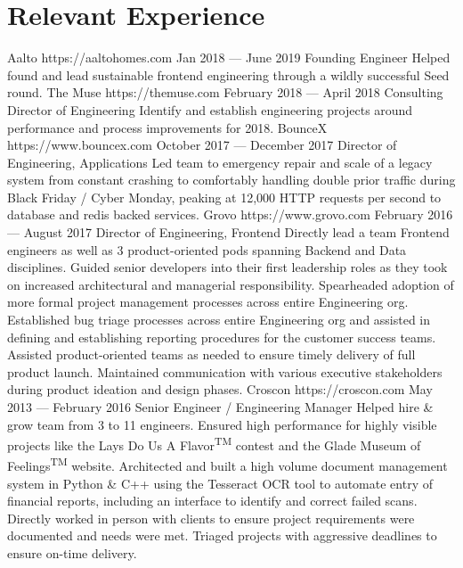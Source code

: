 \documentclass{resume}
\begin{document}
\smallskip

\section{Relevant Experience}

\employer
    {Aalto}
    {https://aaltohomes.com}
    {Jan 2018 --- June 2019}
    {Founding Engineer}
    {Helped found and lead sustainable frontend engineering through a wildly successful Seed round.}
\employer
    {The Muse}
    {https://themuse.com}
    {February 2018 --- April 2018}
    {Consulting Director of Engineering}
    {Identify and establish engineering projects around performance and process improvements for 2018.}
\employer
    {BounceX}
    {https://www.bouncex.com}
    {October 2017 --- December 2017}
    {Director of Engineering, Applications}
    {Led team to emergency repair and scale of a legacy system from constant crashing to comfortably handling double prior traffic during Black Friday / Cyber Monday, peaking at 12,000 HTTP requests per second to database and redis backed services.}
\employer
    {Grovo}
    {https://www.grovo.com}
    {February 2016 --- August 2017}
    {Director of Engineering, Frontend}
    {Directly lead a team Frontend engineers as well as 3 product-oriented pods spanning Backend and Data disciplines. Guided senior developers into their first leadership roles as they took on increased architectural and managerial responsibility. Spearheaded adoption of more formal project management processes across entire Engineering org. Established bug triage processes across entire Engineering org and assisted in defining and establishing reporting procedures for the customer success teams. Assisted product-oriented teams as needed to ensure timely delivery of full product launch. Maintained communication with various executive stakeholders during product ideation and design phases.}
\employer
    {Croscon}
    {https://croscon.com}
    {May 2013 --- February 2016}
    {Senior Engineer / Engineering Manager}
    {Helped hire \& grow team from 3 to 11 engineers. Ensured high performance for highly visible projects like the Lays\textsuperscript{\textregistered} Do Us A Flavor\textsuperscript{TM} contest and the Glade\textsuperscript{\textregistered} Museum of Feelings\textsuperscript{TM} website. Architected and built a high volume document management system in Python \& C++ using the Tesseract OCR tool to automate entry of financial reports, including an interface to identify and correct failed scans. Directly worked in person with clients to ensure project requirements were documented and needs were met. Triaged projects with aggressive deadlines to ensure on-time delivery.}
\end{document}
